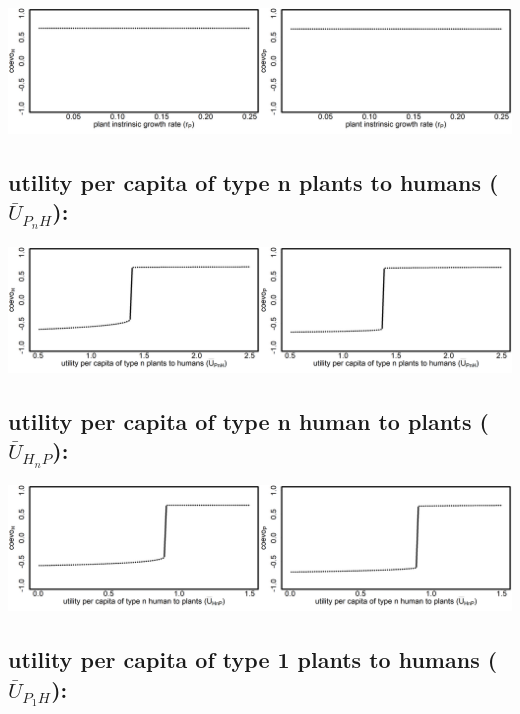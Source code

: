 \documentclass[
]{book}
\begin{document}
\includegraphics[width=1\linewidth]{plots/2_onePar-r.P_bifplot-pair}

\hypertarget{utility-per-capita-of-type-n-plants-to-humans-baru_p_nh-1}{%
\subsection{\texorpdfstring{utility per capita \textbf{of} type n plants \textbf{to} humans (\(\bar{U}_{P_{n}H}\)):}{utility per capita of type n plants to humans (\textbackslash bar\{U\}\_\{P\_\{n\}H\}):}}\label{utility-per-capita-of-type-n-plants-to-humans-baru_p_nh-1}}

\includegraphics[width=1\linewidth]{plots/2_onePar-mU.PnH_bifplot-pair}

\hypertarget{utility-per-capita-of-type-n-human-to-plants-baru_h_np}{%
\subsection{\texorpdfstring{utility per capita \textbf{of} type n human \textbf{to} plants (\(\bar{U}_{H_{n}P}\)):}{utility per capita of type n human to plants (\textbackslash bar\{U\}\_\{H\_\{n\}P\}):}}\label{utility-per-capita-of-type-n-human-to-plants-baru_h_np}}

\includegraphics[width=1\linewidth]{plots/2_onePar-mU.HnP_bifplot-pair}

\hypertarget{utility-per-capita-of-type-1-plants-to-humans-baru_p_1h}{%
\subsection{\texorpdfstring{utility per capita \textbf{of} type 1 plants \textbf{to} humans (\(\bar{U}_{P_{1}H}\)):}{utility per capita of type 1 plants to humans (\textbackslash bar\{U\}\_\{P\_\{1\}H\}):}}\label{utility-per-capita-of-type-1-plants-to-humans-baru_p_1h}}
\end{document}
